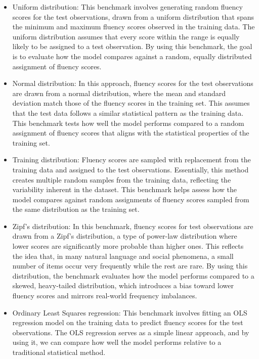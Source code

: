 \documentclass[a4paper,11pt]{report}
\begin{document}
\begin{itemize}
    \item Uniform distribution: This benchmark involves generating random fluency scores for the test observations, drawn from a uniform distribution that spans the minimum and maximum fluency scores observed in the training data. The uniform distribution assumes that every score within the range is equally likely to be assigned to a test observation. By using this benchmark, the goal is to evaluate how the model compares against a random, equally distributed assignment of fluency scores.
    \item Normal distribution: In this approach, fluency scores for the test observations are drawn from a normal distribution, where the mean and standard deviation match those of the fluency scores in the training set. This assumes that the test data follows a similar statistical pattern as the training data. This benchmark tests how well the model performs compared to a random assignment of fluency scores that aligns with the statistical properties of the training set.
    \item Training distribution: Fluency scores are sampled with replacement from the training data and assigned to the test observations. Essentially, this method creates multiple random samples from the training data, reflecting the variability inherent in the dataset. This benchmark helps assess how the model compares against random assignments of fluency scores sampled from the same distribution as the training set.
    \item Zipf's distribution: In this benchmark, fluency scores for test observations are drawn from a Zipf's distribution, a type of power-law distribution where lower scores are significantly more probable than higher ones. This reflects the idea that, in many natural language and social phenomena, a small number of items occur very frequently while the rest are rare. By using this distribution, the benchmark evaluates how the model performs compared to a skewed, heavy-tailed distribution, which introduces a bias toward lower fluency scores and mirrors real-world frequency imbalances.
    \item Ordinary Least Squares regression: This benchmark involves fitting an OLS regression model on the training data to predict fluency scores for the test observations. The OLS regression serves as a simple linear approach, and by using it, we can compare how well the model performs relative to a traditional statistical method.
\end{itemize}
\end{document}
